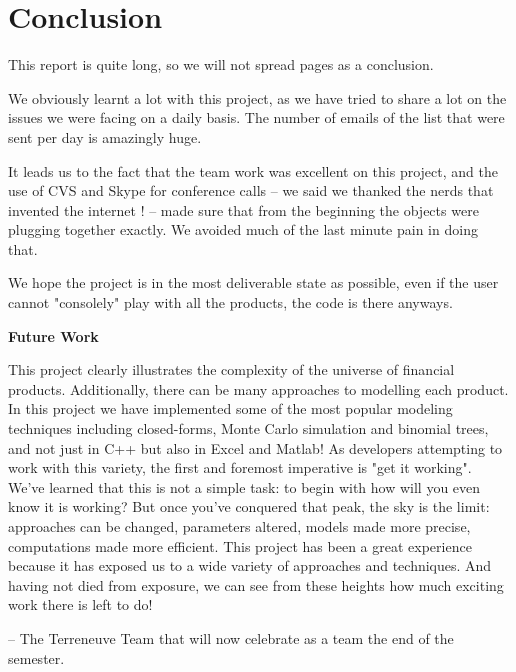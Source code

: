 \chapter{Conclusion}

\par This report is quite long, so we will not spread pages as a conclusion.

We obviously learnt a lot with this project, as we have tried to share a lot on the issues we were facing on a daily basis. The number of emails of the list that were sent per day is amazingly huge. 

It leads us to the fact that the team work was excellent on this project, and the use of CVS and Skype for conference calls -- we said we thanked the nerds that invented the internet ! -- made sure that from the beginning the objects were plugging together exactly. We avoided much of the last minute pain in doing that.

We hope the project is in the most deliverable state as possible, even if the user cannot "consolely" play with all the products, the code is there anyways.

\bigskip

\textbf{Future Work}

This project clearly illustrates the complexity of the universe of financial products.  Additionally, there can be many approaches to modelling each product. In this project we have implemented some of the most popular modeling techniques including closed-forms, Monte Carlo simulation and binomial trees, and not just in C++ but also in Excel and Matlab! As developers attempting to work with this variety, the first and foremost imperative is "get it working". 
We've learned that this is not a simple task: to begin with how will you even know it is working? But once you've conquered that peak, the sky is the limit: approaches can be changed, parameters altered, models made more precise, computations made more efficient. This project has been a great experience because it has exposed us to a wide variety of approaches and techniques. And having not died from exposure, we can see from these heights how much exciting work there is left to do!

\bigskip

\bigskip

-- The Terreneuve Team that will now celebrate as a team the end of the semester.


